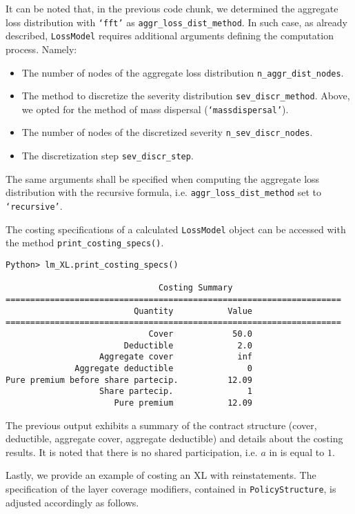 \documentclass{article}
\begin{document}
It can be noted that, in the previous code chunk, we determined the aggregate loss distribution with \texttt{`fft'} as \texttt{aggr\_loss\_dist\_method}. In such case, as already described, \texttt{LossModel} requires additional arguments defining the computation process. Namely:
\begin{itemize}
    \item The number of nodes of the aggregate loss distribution \texttt{n\_aggr\_dist\_nodes}.
    \item The method to discretize the severity distribution \texttt{sev\_discr\_method}. Above, we opted for the method of mass dispersal (\texttt{`massdispersal'}). 
    \item The number of nodes of the discretized severity \texttt{n\_sev\_discr\_nodes}.
    \item The discretization step \texttt{sev\_discr\_step}.
\end{itemize}

The same arguments shall be specified when computing the aggregate loss distribution with the recursive formula, i.e. \texttt{aggr\_loss\_dist\_method} set to \texttt{`recursive'}.

The costing specifications of a calculated \texttt{LossModel} object can be accessed with the method \texttt{print\_costing\_specs()}.

\begin{lstlisting}
Python> lm_XL.print_costing_specs()

                               Costing Summary 
====================================================================
                          Quantity           Value 
====================================================================
                             Cover            50.0
                        Deductible             2.0
                   Aggregate cover             inf
              Aggregate deductible               0
Pure premium before share partecip.          12.09
                   Share partecip.               1
                      Pure premium           12.09

\end{lstlisting}

The previous output exhibits a summary of the contract structure (cover, deductible, aggregate cover, aggregate deductible) and details about the costing results. It is noted that there is no shared participation, i.e. $a$ in  is equal to $1$.

Lastly, we provide an example of costing an XL with reinstatements. The specification of the layer coverage modifiers, contained in \texttt{PolicyStructure}, is adjusted accordingly as follows.
\end{document}
